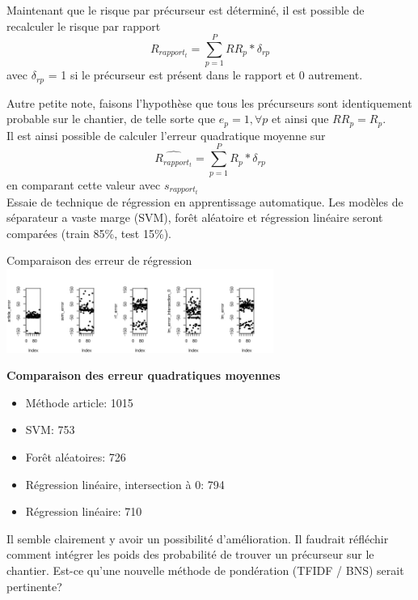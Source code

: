 \begin{frame}
	Maintenant que le risque par précurseur est déterminé, il est possible de recalculer le risque par rapport 
	$$R_{rapport_t} = \sum_{p=1}^{P} RR_p * \delta_{rp}$$
	avec $\delta_{rp}$ = 1 si le précurseur est présent dans le rapport et 0 autrement.
\end{frame}

\begin{frame}
	Autre petite note, faisons l'hypothèse que tous les précurseurs sont identiquement probable sur le chantier, de telle sorte que $e_p = 1, \forall p$ et ainsi que $RR_p = R_p$. \\
	\bigskip
	Il est ainsi possible de calculer l'erreur quadratique moyenne sur 
	$$\widehat{R_{rapport_t}} = \sum_{p=1}^{P} R_p * \delta_{rp}$$
	en comparant cette valeur avec $s_{rapport_t}$\\
	\bigskip
	Essaie de technique de régression en apprentissage automatique. Les modèles de séparateur a vaste marge (SVM), forêt aléatoire et régression linéaire seront comparées (train 85\%, test 15\%).
\end{frame}

\begin{frame}[c]
	Comparaison des erreur de régression 
	\includegraphics[width=330px] {error_comparison}
\end{frame}


\begin{frame}
	\textbf{Comparaison des erreur quadratiques moyennes}
	\begin{itemize}
		\item Méthode article: 1015
		\item SVM: 753
		\item Forêt aléatoires: 726
		\item Régression linéaire, intersection à 0: 794
		\item Régression linéaire: 710 
	\end{itemize}

	Il semble clairement y avoir un possibilité d'amélioration. Il faudrait réfléchir comment intégrer les poids des probabilité de trouver un précurseur sur le chantier. Est-ce qu'une nouvelle méthode de pondération (TFIDF / BNS) serait pertinente?
\end{frame}


